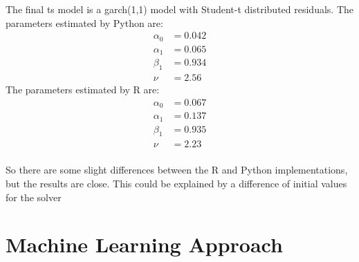 The final \acrshort{ts} model is a \acrshort{garch}(1,1) model with Student-t distributed residuals. The parameters estimated by Python are:
\begin{align*}
\alpha_0 &= 0.042 \\
\alpha_1 &= 0.065 \\
\beta_1 &= 0.934 \\
\nu &= 2.56
\end{align*}
The parameters estimated by R are:
\begin{align*}
\alpha_0 &= 0.067 \\
\alpha_1 &= 0.137 \\
\beta_1 &= 0.935 \\
\nu &= 2.23 \\
\end{align*}

So there are some slight differences between the R and Python implementations, but the results are close. This could be explained by a difference of initial values for the solver


\section{Machine Learning Approach}